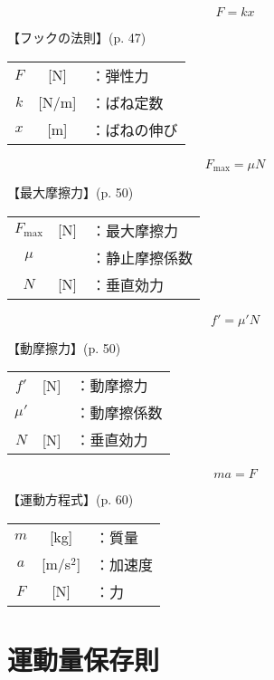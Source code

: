 \documentclass[10pt]{jarticle}
\begin{document}
\newpage
\[
	F = k x
\]


\vskip3mm
【フックの法則】{\footnotesize (p. 47)}

\begin{tabular}{ccl}
$F$	&[N]	&：弾性力\\
$k$	&[N/m]	&：ばね定数\\
$x$	&[m]	&：ばねの伸び
\end{tabular}






\newpage
\[
	F_\mathrm{max} =  \mu N
\]


\vskip3mm
【最大摩擦力】{\footnotesize (p. 50)}

\begin{tabular}{ccl}
$F_\mathrm{max}$	&[N]	&：最大摩擦力\\
$\mu$	&	&：静止摩擦係数\\
$N$	&[N]	&：垂直効力
\end{tabular}





\newpage
\[
	f' =  \mu' N
\]


\vskip3mm
【動摩擦力】{\footnotesize (p. 50)}

\begin{tabular}{ccl}
$f'$	&[N]	&：動摩擦力\\
$\mu'$	&	&：動摩擦係数\\
$N$	&[N]	&：垂直効力
\end{tabular}





\newpage
\[
	m a = F
\]


\vskip3mm
【運動方程式】{\footnotesize (p. 60)}

\begin{tabular}{ccl}
$m$	&[kg]	&：質量\\
$a$	&[m/s$^2$]	&：加速度\\
$F$	&[N]	&：力
\end{tabular}





\newpage
\addtocounter{page}{-1}
\thispagestyle{empty}
\section{運動量保存則}
\end{document}
